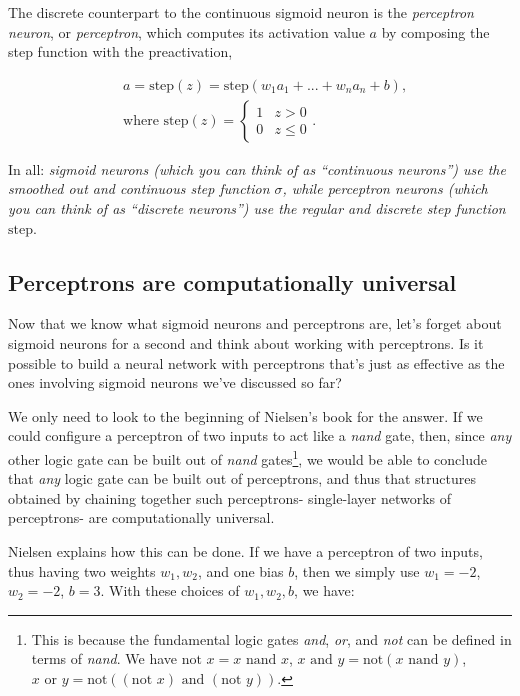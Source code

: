 \documentclass{article}
\begin{document}
	The discrete counterpart to the continuous sigmoid neuron is the \textit{perceptron neuron}, or \textit{perceptron}, which computes its activation value $a$ by composing the step function with the preactivation,
	
	\begin{align*}
		&a = \text{step}(z)
		= \text{step}(w_1 a_1 + ... + w_n a_n + b), \\
		&\text{where } \text{step}(z) =
		\begin{cases}
			1 & z > 0 \\
			0 & z \leq 0
		\end{cases}.
	\end{align*}
	
	In all: \textit{sigmoid neurons (which you can think of as ``continuous neurons'') use the smoothed out and continuous step function $\sigma$, while perceptron neurons (which you can think of as ``discrete neurons'') use the regular and discrete step function} $\text{step}$.
	
	\subsection*{Perceptrons are computationally universal}
	
	Now that we know what sigmoid neurons and perceptrons are, let's forget about sigmoid neurons for a second and think about working with perceptrons. Is it possible to build a neural network with perceptrons that's just as effective as the ones involving sigmoid neurons we've discussed so far?
	
	We only need to look to the beginning of Nielsen's book for the answer. If we could configure a perceptron of two inputs to act like a \textit{nand} gate, then, since \textit{any} other logic gate can be built out of \textit{nand} gates\footnote{This is because the fundamental logic gates \textit{and}, \textit{or}, and \textit{not} can be defined in terms of \textit{nand}. We have $\text{not } x = x \text{ nand } x$, $x \text{ and } y = \text{not}(x \text{ nand } y)$, $x \text{ or } y = \text{not}((\text{not } x) \text{ and } (\text{not } y))$.}, we would be able to conclude that \textit{any} logic gate can be built out of perceptrons, and thus that structures obtained by chaining together such perceptrons- single-layer networks of perceptrons- are computationally universal.
	
	Nielsen explains how this can be done. If we have a perceptron of two inputs, thus having two weights $w_1, w_2$, and one bias $b$, then we simply use $w_1 = -2$, $w_2 = -2$, $b = 3$. With these choices of $w_1, w_2, b$, we have:
	
\end{document}
